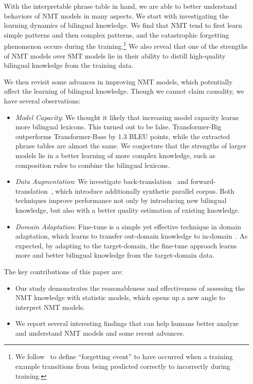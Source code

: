 \documentclass[11pt,a4paper]{article}
\begin{document}
With the interpretable phrase table in hand, we are able to better understand behaviors of NMT models in many aspects. We start with investigating the learning dynamics of bilingual knowledge. We find that NMT tend to first learn simple patterns and then complex patterns, and the catastrophic forgetting phenomenon occurs during the training.\footnote{We follow~ to define ``forgetting event'' to have occurred when a training example transitions from being predicted correctly to incorrectly during training.}
We also reveal that one of the strengths of NMT models over SMT models lie in their ability to distill high-quality bilingual knowledge from the training data.

We then revisit some advances in improving NMT models, which potentially affect the learning of bilingual knowledge. Though we cannot claim causality, we have several observations:
\begin{itemize}
    \item {\em Model Capacity}: 
    We thought it likely that increasing model capacity learns more bilingual lexicons. This turned out to be false. Transformer-Big outperforms Transformer-Base by 1.3 BLEU points, while the extracted phrase tables are almost the same. We conjecture that the strengths of larger models lie in a better learning of more complex knowledge, such as composition rules to combine the bilingual lexicons.

    \item {\em Data Augmentation}: We investigate back-translation~\cite{sennrich:2016:acl} and forward-translation~\cite{zhang2016exploiting, he2019revisiting}, which introduce additionally synthetic parallel corpus. Both techniques improve performance not only by introducing new bilingual knowledge, but also with a better quality estimation of existing knowledge.
    
    \item {\em Domain Adaptation}: Fine-tune is a simple yet effective technique in domain adaptation, which learns to transfer out-domain knowledge to in-domain~\cite{luong2015stanford}. As expected, by adapting to the target-domain, the fine-tune approach learns more and better bilingual knowledge from the target-domain data.
\end{itemize}


\noindent The key contributions of this paper are:
\begin{itemize}
\item Our study demonstrates the reasonableness and effectiveness of assessing the NMT knowledge with statistic models, which opens up a new angle to interpret NMT models.

\item We report several interesting findings that can help humans better analyze and understand NMT models and some recent advances. 
\end{itemize}
\end{document}
